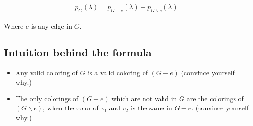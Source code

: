 \documentclass[12pt]{exam}
\begin{document}
\begin{gather*}
    p_G(\lambda) = p_{G - e}(\lambda) - p_{G \backslash e}(\lambda)
\end{gather*}


Where $e$ is any edge in $G$.

\subsection*{Intuition behind the formula}

\begin{itemize}
    \item Any valid coloring of $G$ is a valid coloring of $(G - e)$ (convince yourself why.)
    \item The only colorings of $(G-e)$ which are not valid in $G$ are the colorings of $(G \backslash e)$, when the color of $v_1$ and $v_2$ is the same in $G - e$. (convince yourself why.)
\end{itemize}

\newcommand{\marksA}[1]{\hfill\makebox[0pt][l]{~#1}}
\end{document}
